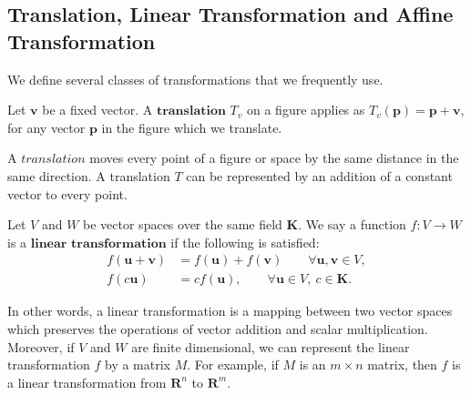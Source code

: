    \subsection{Translation, Linear Transformation and Affine Transformation}
      
      We define several classes of transformations that we frequently use.
      
      \begin{definition*}
         Let $\textbf{v}$ be a fixed vector. A $\textbf{translation}$ ${T}_v$ on a figure applies as ${T}_v (\textbf{p}) = \textbf{p} + \textbf{v}$, for any vector $\textbf{p}$ in the figure which we translate.
      \end{definition*}
      A $\textit{translation}$ moves every point of a figure or space by the same distance in the same direction. A translation ${T}$ can be represented by an addition of a constant vector to every point.


      \begin{definition*}
      Let ${V}$ and ${W}$ be vector spaces over the same field $\textbf{K}$. We say a function $\mathit{f}: {V} \rightarrow {W}$ is a $\textbf{linear transformation}$ if the following is satisfied:
      \begin{align*}
      \mathit{f}(\textbf{u} + \textbf{v}) &= \mathit{f}(\textbf{u}) + \mathit{f}(\textbf{v}) \qquad \forall \textbf{u}, \textbf{v} \in{V},\\
      \mathit{f}(c\textbf{u}) &= c\mathit{f}(\textbf{u}), \qquad \forall \textbf{u} \in{V}, ~c\in\textbf{K}.
      \end{align*}
      \end{definition*}
      In other words, a linear transformation is a mapping between two vector spaces which preserves the operations of vector addition and scalar multiplication. Moreover, if ${V}$ and ${W}$ are finite dimensional, we can represent the linear transformation ${f}$ by a matrix ${M}$. For example, if ${M}$ is an ${m} \times {n}$ matrix, then ${f}$ is a linear transformation from $\mathbf{R}^n$ to $\mathbf{R}^m$. 


